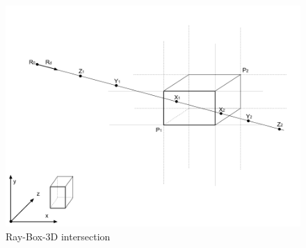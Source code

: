 \begin{figure}[H]\label{fig:ray-box-3d}
\centering
\includegraphics[width=\linewidth]{Figures/ray-box-3d-intersection.png}
\decoRule
\caption[ray-box-3d-intersection]{Ray-Box-3D intersection}
\end{figure}

